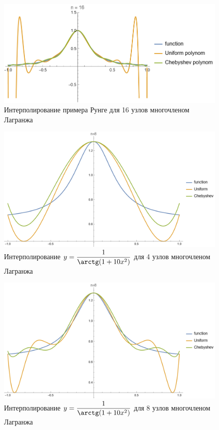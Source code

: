 \documentclass{article}
\begin{document}
    \begin{figure}[H]
        \includegraphics[width=\textwidth]{runge16.png}
        \caption{Интерполирование примера Рунге для 16 узлов многочленом Лагранжа}
    \end{figure}
    \begin{figure}[H]
        \includegraphics[width=\textwidth]{atan4.png}
        \caption{Интерполирование $y = \dfrac{1}{\arctg (1+10x^2)}$ для 4 узлов многочленом Лагранжа}
    \end{figure}
    \begin{figure}[H]
        \includegraphics[width=\textwidth]{atan8.png}
        \caption{Интерполирование $y = \dfrac{1}{\arctg (1+10x^2)}$ для 8 узлов многочленом Лагранжа}
    \end{figure}
\end{document}
